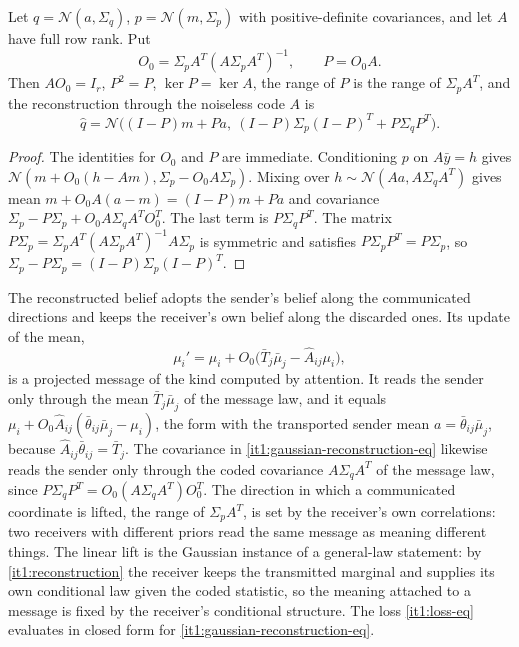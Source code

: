Let $q=\mathcal N(a,\Sigma_q)$, $p=\mathcal N(m,\Sigma_p)$ with positive-definite covariances, and let $A$ have full row rank. Put
\begin{equation}
O_0=\Sigma_pA^T(A\Sigma_pA^T)^{-1},\qquad P=O_0A.
\label{it1:projector}
\end{equation}
Then $AO_0=I_r$, $P^2=P$, $\ker P=\ker A$, the range of $P$ is the range of $\Sigma_pA^T$, and the reconstruction through the noiseless code $A$ is
\begin{equation}
\hat q=\mathcal N\bigl((I-P)m+Pa,\ (I-P)\Sigma_p(I-P)^T+P\Sigma_qP^T\bigr).
\label{it1:gaussian-reconstruction-eq}
\end{equation}
\begin{proof}
The identities for $O_0$ and $P$ are immediate. Conditioning $p$ on $A\bar y=h$ gives $\mathcal N(m+O_0(h-Am),\Sigma_p-O_0A\Sigma_p)$. Mixing over $h\sim\mathcal N(Aa,A\Sigma_qA^T)$ gives mean $m+O_0A(a-m)=(I-P)m+Pa$ and covariance $\Sigma_p-P\Sigma_p+O_0A\Sigma_qA^TO_0^T$. The last term is $P\Sigma_qP^T$. The matrix $P\Sigma_p=\Sigma_pA^T(A\Sigma_pA^T)^{-1}A\Sigma_p$ is symmetric and satisfies $P\Sigma_pP^T=P\Sigma_p$, so $\Sigma_p-P\Sigma_p=(I-P)\Sigma_p(I-P)^T$.
\end{proof}

The reconstructed belief adopts the sender's belief along the communicated directions and keeps the receiver's own belief along the discarded ones. Its update of the mean,
\begin{equation}
\mu_i'=\mu_i+O_0\bigl(\bar T_j\bar\mu_j-\hat A_{ij}\mu_i\bigr),
\label{it1:mean-update}
\end{equation}
is a projected message of the kind computed by attention. It reads the sender only through the mean $\bar T_j\bar\mu_j$ of the message law, and it equals $\mu_i+O_0\hat A_{ij}(\bar\theta_{ij}\bar\mu_j-\mu_i)$, the form with the transported sender mean $a=\bar\theta_{ij}\bar\mu_j$, because $\hat A_{ij}\bar\theta_{ij}=\bar T_j$. The covariance in \cref{it1:gaussian-reconstruction-eq} likewise reads the sender only through the coded covariance $A\Sigma_qA^T$ of the message law, since $P\Sigma_qP^T=O_0(A\Sigma_qA^T)O_0^T$. The direction in which a communicated coordinate is lifted, the range of $\Sigma_pA^T$, is set by the receiver's own correlations: two receivers with different priors read the same message as meaning different things. The linear lift is the Gaussian instance of a general-law statement: by \cref{it1:reconstruction} the receiver keeps the transmitted marginal and supplies its own conditional law given the coded statistic, so the meaning attached to a message is fixed by the receiver's conditional structure. The loss \cref{it1:loss-eq} evaluates in closed form for \cref{it1:gaussian-reconstruction-eq}.

